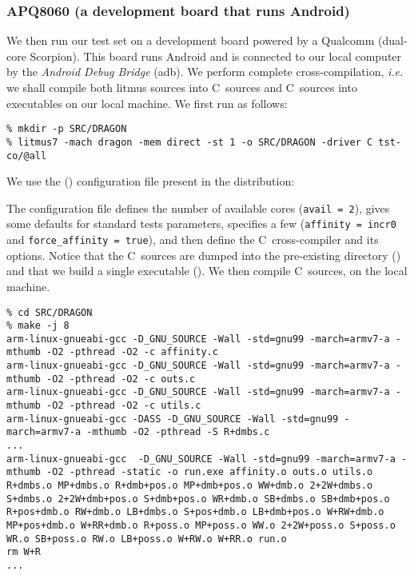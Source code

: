 \subsubsection{\label{driverc:example}APQ8060 (a development board that runs Android)}
We then run our test set on a development board
powered by a Qualcomm  (dual-core Scorpion).
This board runs Android and is connected to our local computer
by the \emph{Android Debug Bridge} (adb).
We perform complete cross-compilation, \emph{i.e.} we shall compile
both litmus sources into C~sources and C~sources into executables
on our local machine. We first run \litmus{} as follows:
\begin{verbatim}
% mkdir -p SRC/DRAGON
% litmus7 -mach dragon -mem direct -st 1 -o SRC/DRAGON -driver C tst-co/@all
\end{verbatim}
We use the  (\litmus{}) configuration file present
in the \litmus{} distribution:

The configuration file defines the number of available cores
(\verb+avail = 2+),
gives some defaults for standard tests parameters,
specifies a few 
(\verb+affinity = incr0+ and \verb+force_affinity = true+), and then
define the C~cross-compiler and its options.
Notice that the C~sources are dumped into the pre-existing
directory () and that we build a single executable
().
We then compile C~sources, on the local machine.
\begin{verbatim}
% cd SRC/DRAGON
% make -j 8
arm-linux-gnueabi-gcc -D_GNU_SOURCE -Wall -std=gnu99 -march=armv7-a -mthumb -O2 -pthread -O2 -c affinity.c
arm-linux-gnueabi-gcc -D_GNU_SOURCE -Wall -std=gnu99 -march=armv7-a -mthumb -O2 -pthread -O2 -c outs.c
arm-linux-gnueabi-gcc -D_GNU_SOURCE -Wall -std=gnu99 -march=armv7-a -mthumb -O2 -pthread -O2 -c utils.c
arm-linux-gnueabi-gcc -DASS -D_GNU_SOURCE -Wall -std=gnu99 -march=armv7-a -mthumb -O2 -pthread -S R+dmbs.c
...
arm-linux-gnueabi-gcc  -D_GNU_SOURCE -Wall -std=gnu99 -march=armv7-a -mthumb -O2 -pthread -static -o run.exe affinity.o outs.o utils.o R+dmbs.o MP+dmbs.o R+dmb+pos.o MP+dmb+pos.o WW+dmb.o 2+2W+dmbs.o S+dmbs.o 2+2W+dmb+pos.o S+dmb+pos.o WR+dmb.o SB+dmbs.o SB+dmb+pos.o R+pos+dmb.o RW+dmb.o LB+dmbs.o S+pos+dmb.o LB+dmb+pos.o W+RW+dmb.o MP+pos+dmb.o W+RR+dmb.o R+poss.o MP+poss.o WW.o 2+2W+poss.o S+poss.o WR.o SB+poss.o RW.o LB+poss.o W+RW.o W+RR.o run.o
rm W+R
...
\end{verbatim}
